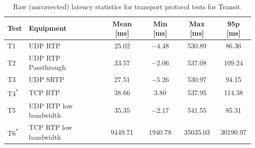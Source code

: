 \begin{table}[H]
    \centering
    \caption{Raw (uncorrected) latency statistics for transport protocol tests for Transit.}\label{tab:transit_transport_raw}
    \begin{minipage}{\linewidth}
    \centering
    \begin{tabular}{|l|l|c|c|c|c|}
    \hline
    \textbf{Test} & \textbf{Equipment} & \textbf{Mean [ms]} & \textbf{Min [ms]} & \textbf{Max [ms]} & \textbf{95p [ms]} \\
    \hline
    T1 & UDP RTP & 25.02 & \(-4.48\) & 530.89 & 86.36\\
    \hline
    T2 & UDP RTP Passthrough & 33.57 & \(-2.06\) & 537.08 & 109.24  \\
    \hline
    T3 & UDP SRTP & 27.51 & \(-5.26\) & 530.97 & 94.15 \\
    \hline
    T4\textsuperscript{*} & TCP RTP & 38.66 & 3.80 & 537.95 & 114.38  \\
    \hline
    T5 & UDP RTP low bandwidth & 35.35 & \(-2.17\) & 541.55 & 85.31\\
    \hline
    T6\textsuperscript{*} & TCP RTP low bandwidth & 9449.71 & 1940.78 & 35035.03 & 30190.97 \\
    \hline
    \end{tabular}
    \vspace{3pt}
    \par{}
    \end{minipage}
\end{table}
